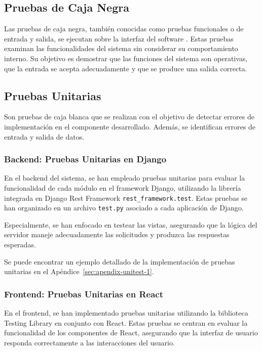 \subsection{Pruebas de Caja Negra}

Las pruebas de caja negra, también conocidas como pruebas funcionales o de entrada y salida, se ejecutan sobre la interfaz del software \cite{Pressman}. Estas pruebas examinan las funcionalidades del sistema sin considerar su comportamiento interno. Su objetivo es demostrar que las funciones del sistema son operativas, que la entrada se acepta adecuadamente y que se produce una salida correcta.

\subsection{Pruebas Unitarias}

Son pruebas de caja blanca que se realizan con el objetivo de
detectar errores de implementación en el componente desarrollado. Además, se
identifican errores de entrada y salida de datos.

\subsubsection{Backend: Pruebas Unitarias en Django}

En el backend del sistema, se han empleado pruebas unitarias para evaluar la funcionalidad de cada módulo en el framework Django,  utilizando la librería integrada en Django Rest Framework \texttt{rest\_framework.test}. Estas pruebas se han organizado en un archivo \texttt{test.py} asociado a cada aplicación de Django.

Especialmente, se han enfocado en testear las vistas, asegurando que la lógica del servidor maneje adecuadamente las solicitudes y produzca las respuestas esperadas. 

Se puede encontrar un ejemplo detallado de la implementación de pruebas unitarias en el Apéndice~\ref{sec:apendix-unitest-1}.

\subsubsection{Frontend: Pruebas Unitarias en React}

En el frontend, se han implementado pruebas unitarias utilizando la biblioteca Testing Library en conjunto con React. Estas pruebas se centran en evaluar la funcionalidad de los componentes de React, asegurando que la interfaz de usuario responda correctamente a las interacciones del usuario.

